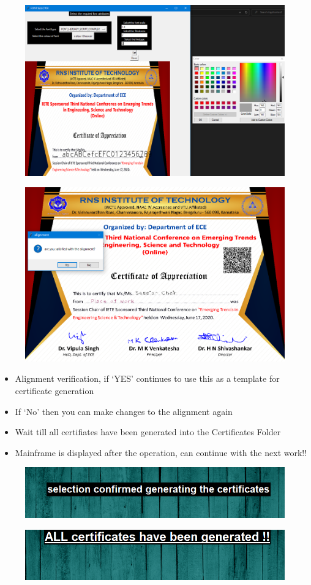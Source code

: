 \begin{figure}[H]
	\centering
	\includegraphics[width=0.7\linewidth]{"images/generation_qr_nqr/Screenshot (44)"}
	\label{fig:screenshot-44}
\end{figure}

\begin{figure}[H]
	\centering
	\includegraphics[width=0.9\linewidth]{"images/generation_qr_nqr/Screenshot (59)"}
	\label{fig:screenshot-59}
\end{figure}

\begin{itemize}
	\item Alignment verification, if `YES' continues to use this as a template for certificate generation
	\item If `No' then you can make changes to the alignment again
	\item Wait till all certifiates have been generated into the Certificates Folder
	\item Mainframe is displayed after the operation, can continue with the next work!!
\end{itemize}

\begin{figure}[H]
	\centering
	\includegraphics[width=0.7\linewidth]{"images/generation_qr_nqr/Screenshot (48)"}
	\label{fig:screenshot-48}
\end{figure}

\begin{figure}[H]
	\centering
	\includegraphics[width=0.7\linewidth]{"images/generation_qr_nqr/Screenshot (49)"}
	\label{fig:screenshot-49}
\end{figure}


